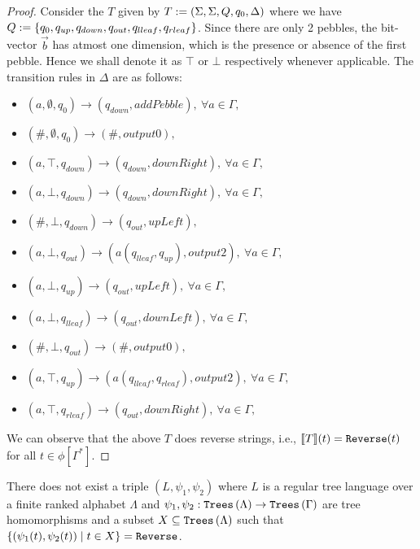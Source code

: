 \begin{proof}
    Consider the  $T$ given by $T := (\Sigma, \Sigma, Q, q_0, \Delta)$ where we have $Q := \left\{ q_0, q_{up}, q_{down}, q_{out}, q_{lleaf}, q_{rleaf} \right\}$. Since there are only 2 pebbles, the bit-vector $\vec{b}$ has atmost one dimension, which is the presence or absence of the first pebble. Hence we shall denote it as $\top$ or $\bot$ respectively whenever applicable. The transition rules in $\Delta$ are as follows:
    \begin{itemize}
        \item $(a, \emptyset, q_0) \to (q_{down}, addPebble),~ \forall a \in \Gamma,$
        \item $(\#, \emptyset, q_0) \to (\#, output0),$
        \item $(a, \top, q_{down}) \to (q_{down}, downRight),~ \forall a \in \Gamma,$
        \item $(a, \bot, q_{down}) \to (q_{down}, downRight),~ \forall a \in \Gamma,$
        \item $(\#, \bot, q_{down}) \to (q_{out}, upLeft),$
        \item $(a, \bot, q_{out}) \to (a(q_{lleaf}, q_{up}), output2),~ \forall a \in \Gamma,$
        \item $(a, \bot, q_{up}) \to (q_{out}, upLeft),~ \forall a \in \Gamma,$
        \item $(a, \bot, q_{lleaf}) \to (q_{out}, downLeft),~ \forall a \in \Gamma,$
        \item $(\#, \bot, q_{out}) \to (\#, output0),$
        \item $(a, \top, q_{up}) \to (a(q_{lleaf}, q_{rleaf}), output2),~ \forall a \in \Gamma,$
        \item $(a, \top, q_{rleaf}) \to (q_{out}, downRight),~ \forall a \in \Gamma,$
    \end{itemize}
    We can observe that the above  $T$ does reverse strings, i.e., $\llbracket T \rrbracket(t) = \texttt{Reverse}(t)$ for all $t \in \phi[\Gamma^*]$.
\end{proof}

\begin{theorem}\label{thm:bimorphismCannotReverse}
    There does not exist a triple $(L, \psi_1, \psi_2)$ where $L$ is a regular tree language over a finite ranked alphabet $\Lambda$ and $\psi_1, \psi_2 : \texttt{Trees}\left(\Lambda\right) \to \texttt{Trees}\left(\Gamma\right)$ are tree homomorphisms and a subset $X \subseteq \texttt{Trees}\left(\Lambda\right)$ such that $\left\{ (\psi_1(t), \psi_2(t)) \mid t \in X \right\} = \texttt{Reverse}$.
\end{theorem}

